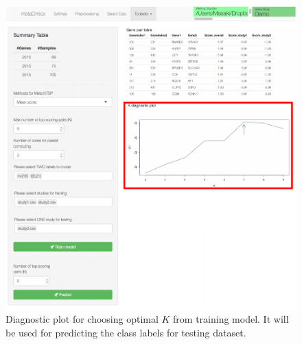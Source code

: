 \documentclass{article}
\begin{document}
\begin{figure}[H]
\begin{center}
\includegraphics[scale=0.7]{./figure/MetaKTSP/Figure10.pdf}
\caption{Diagnostic plot for choosing optimal $K$ from training model. It will be used for predicting the class labels for testing dataset.}
\label{fig:DiagnosticPlot}
\end{center}
\end{figure}
\end{document}
